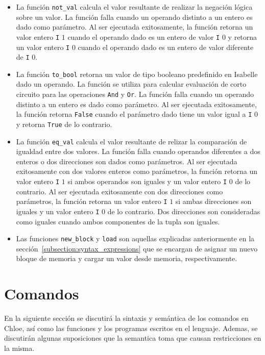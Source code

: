 \begin{itemize}
\item{La función \verb|not_val| calcula el valor resultante de realizar la negación lógica sobre un valor.
La función falla cuando un operando distinto a un entero es dado como parámetro.
Al ser ejecutada exitosamente, la función retorna un valor entero \verb|I| $1$ cuando el operando dado es un entero de valor \verb|I| $0$ y retorna un valor entero \verb|I| $0$ cuando el operando dado es un entero de valor diferente de \verb|I| $0$.}

\item{La función \verb|to_bool| retorna un valor de tipo booleano predefinido en Isabelle dado un operando.
La función se utiliza para calcular evaluación de corto circuito para las operaciones \verb|And| y \verb|Or|.
La función falla cuando un operando distinto a un entero es dado como parámetro.
Al ser ejecutada exitosamente, la función retorna \verb|False| cuando el parámetro dado tiene un valor igual a \verb|I| $0$ y retorna \verb|True| de lo contrario.}

\item{La función \verb|eq_val| calcula el valor resultante de relizar la comparación de igualdad entre dos valores.
La función falla cuando operandos diferentes a dos enteros o dos direcciones son dados como parámetros.
Al ser ejecutada exitosamente con dos valores enteros como parámetros, la función retorna un valor entero \verb|I| $1$ si ambos operandos son iguales y un valor entero \verb|I| $0$ de lo contrario.
Al ser ejecutada exitosamente con dos direcciones como parámetros, la función retorna un valor entero \verb|I| $1$ si ambas direcciones son iguales y un valor entero \verb|I| $0$ de lo contrario.
Dos direcciones son consideradas como iguales cuando ambos componentes de la tupla son iguales.}

\item{Las funciones \verb|new_block| y \verb|load| son aquellas explicadas anteriormente en la sección~\ref{subsection:syntax_expressions} que se encargan de asignar un nuevo bloque de memoria y cargar un valor desde memoria, respectivamente.}
\end{itemize}


\section{Comandos}\label{section:commands}

En la siguiente sección se discutirá la sintaxis y semántica de los comandos en Chloe, así como las funciones y los programas escritos en el lenguaje.
Ademas, se discutirán algunas suposiciones que la semantica toma que causan restricciones en la misma.

